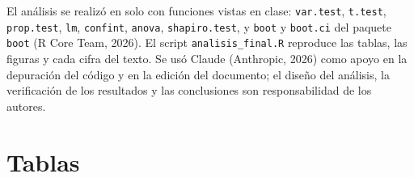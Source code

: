 \documentclass[12pt,letterpaper]{article}
\begin{document}
El análisis se realizó en \VersionRCorta{} solo con funciones vistas en clase:
\texttt{var.test}, \texttt{t.test}, \texttt{prop.test}, \texttt{lm},
\texttt{confint}, \texttt{anova}, \texttt{shapiro.test}, y \texttt{boot} y
\texttt{boot.ci} del paquete \texttt{boot} (R Core Team, 2026). El script
\texttt{analisis\_final.R} reproduce las tablas, las figuras y cada cifra del
texto. Se usó Claude (Anthropic, 2026) como apoyo en la depuración del código
y en la edición del documento; el diseño del análisis, la verificación de los
resultados y las conclusiones son responsabilidad de los autores.

\newpage




\newpage


\section{Tablas}
\vspace{6pt}
\end{document}
